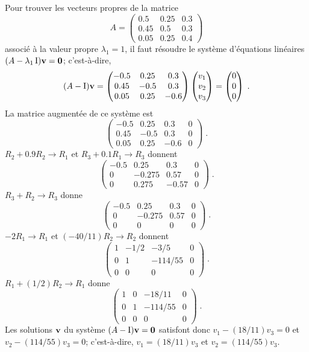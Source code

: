 {Pour trouver les vecteurs propres de la matrice
\[
A = \begin{pmatrix}
0.5 & 0.25 & 0.3 \\
0.45 & 0.5 & 0.3 \\
0.05 & 0.25 & 0.4 \end{pmatrix}
\]
associé à la valeur propre $\lambda_1=1$, il faut résoudre le système
d'équations linéaires $(A-\lambda_1 \operatorname{I}) \mathbf{v} = \mathbf{0}$;
c'est-à-dire,
\[
(A- \operatorname{I}) \mathbf{v}
= \begin{pmatrix}
-0.5 & 0.25 & 0.3 \\
0.45 & -0.5 & 0.3 \\
0.05 & 0.25 & -0.6
\end{pmatrix}
\begin{pmatrix} v_1 \\ v_2 \\ v_3  \end{pmatrix} =
\begin{pmatrix} 0 \\ 0 \\ 0 \end{pmatrix}\; .
\]
La matrice augmentée de ce système est
\[
\left(\begin{array}{rrr|r}
-0.5 & 0.25 & 0.3 & 0 \\
0.45 & -0.5 & 0.3 & 0 \\
0.05 & 0.25 & -0.6 & 0
\end{array}\right) \; .
\]
$R_2 + 0.9 R_2 \to R_1$ et $R_3 + 0.1 R_1 \to R_3$ donnent
\[
\left(\begin{array}{rrr|r}
-0.5 & 0.25 & 0.3 & 0 \\
0 & -0.275 & 0.57 & 0 \\
0 & 0.275 & -0.57 & 0
\end{array}\right) \; .
\]
$R_3 + R_2 \to R_3$ donne
\[
\left(\begin{array}{rrr|r}
-0.5 & 0.25 & 0.3 & 0 \\
0 & -0.275 & 0.57 & 0 \\
0 & 0 & 0 & 0
\end{array}\right) \; .
\]
$-2R_1 \to R_1$ et $(-40/11) R_2 \to R_2$ donnent
\[
\left(\begin{array}{rrr|r}
1 & -1/2 & -3/5 & 0 \\
0 & 1 & -114/55 & 0 \\
0 & 0 & 0 & 0
\end{array}\right) \; .
\]
$R_1 + (1/2)R_2 \to R_1$ donne
\[
\left(\begin{array}{rrr|r}
1 & 0 & -18/11 & 0 \\
0 & 1 & -114/55 & 0 \\
0 & 0 & 0 & 0
\end{array}\right) \; .
\]
Les solutions $\mathbf{v}$ du système $(A-\operatorname{I}) \mathbf{v} = \mathbf{0}$ satisfont
donc $v_1 - (18/11) v_3 = 0$ et $v_2 - (114/55) v_3 = 0$;
c'est-à-dire, $v_1=(18/11)v_3$ et $v_2 = (114/55) v_3$.

}
